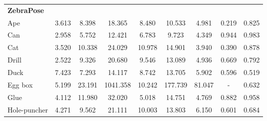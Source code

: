 \documentclass[11pt]{article}
\begin{document}
\begin{table}[htbp]
{\begin{tabular}{l|ccc|ccc|cc}
    \textbf{ZebraPose}  &&&&&&&& \\
    \hspace{10px} Ape &
      3.613 &
      8.398 &
      18.365 &
      8.480 &
      10.533 &
      4.981 &
      0.219 &
      0.825 \\ 
    \hspace{10px} Can &
      2.958 &
      5.752 &
      12.421 &
      6.783 &
      9.723 &
      4.349 &
      0.944 &
      0.983 \\ 
    \hspace{10px} Cat &
      3.520 &
      10.338 &
      24.029 &
      10.978 &
      14.901 &
      3.940 &
      0.390 &
      0.878 \\ 
    \hspace{10px} Drill &
      2.522 &
      9.326 &
      20.680 &
      9.546 &
      13.089 &
      4.936 &
      0.669 &
      0.792 \\ 
    \hspace{10px} Duck &
      7.423 &
      7.293 &
      14.117 &
      8.742 &
      13.705 &
      5.902 &
      0.596 &
      0.519 \\ 
    \hspace{10px} Egg box &
      5.199 &
      23.191 &
      1041.358 &
      10.242 &
      177.739 &
      81.047 &
      - &
      0.632 \\ 
    \hspace{10px} Glue &
      4.112 &
      11.980 &
      32.020 &
      5.018 &
      14.751 &
      4.769 &
      0.882 &
      0.958 \\ 
    \hspace{10px} Hole-puncher &
      4.271 &
      9.562 &
      21.111 &
      10.003 &
      13.803 &
      6.150 &
      0.601 &
      0.684 \\ \hline
\end{tabular}
}
\end{table}
\end{document}
